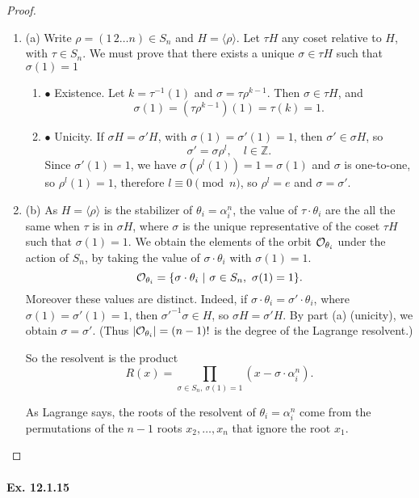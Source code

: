 \documentclass[11pt,a4paper]{article}
\newcommand{\be} {\begin{enumerate}}
\newcommand{\ee} {\end{enumerate}}
\newcommand{\Z}{\mathbb{Z}}
\begin{document}
\begin{proof}
\be
\item[(a)]
Write $\rho =  (1\, 2 \ldots n)  \in S_n$ and $H = \langle \rho \rangle$. Let $\tau H$ any coset relative to $H$, with $\tau \in S_n$. We must prove that there exists a unique $\sigma \in \tau H$ such that $\sigma(1) = 1$
	\be
	
	\item[$\bullet$] Existence.
	Let $k = \tau^{-1}(1)$ and $\sigma = \tau \rho^{k-1}$. Then $\sigma  \in \tau H$, and 
	$$\sigma(1) = (\tau \rho^{k-1})(1) = \tau(k) = 1.$$
	\item[$\bullet$] Unicity. If $\sigma H = \sigma' H$, with $\sigma(1) = \sigma'(1)=1$, then $\sigma' \in \sigma H$, so $$\sigma' = \sigma \rho^l, \quad l\in \Z.$$
	Since $\sigma'(1) = 1$, we have $\sigma(\rho^l(1)) = 1 = \sigma(1)$ and $\sigma$ is one-to-one, so $\rho^l(1) = 1$, therefore $l\equiv 0 \pmod n$, so $\rho^l =  e$ and $\sigma = \sigma'$.
	\ee
\item[(b)] As $H = \langle \rho \rangle$ is the stabilizer of $\theta_i = \alpha_i^n$, the value of $\tau \cdot \theta_i$ are the all the same when $\tau$ is in $\sigma H$, where $\sigma$ is the unique representative of the coset $\tau H$ such that $\sigma(1)=1$. We obtain the elements of the orbit ${\cal O}_{\theta_i}$  under the action of $S_n$, by taking the value of $\sigma \cdot \theta_i$ with $\sigma(1) = 1$. 
$${\cal O}_{\theta_i} = \{ \sigma \cdot \theta_i\ | \ \sigma \in S_n,\  \sigma(1)=1\}.$$
Moreover these values are distinct. Indeed, if $\sigma \cdot \theta_i = \sigma' \cdot \theta_i$, where $\sigma(1) = \sigma'(1) = 1$, then $\sigma'^{-1} \sigma \in H$, so $\sigma H = \sigma' H$. By part (a) (unicity), we obtain $\sigma = \sigma'$. (Thus $|{\cal O}_{\theta_i}| = (n-1)!$ is the degree of the Lagrange resolvent.)

So the resolvent is the product $$R(x) = \prod_{\sigma\in S_n,\ \sigma(1) = 1} (x - \sigma\cdot \alpha_i^n).$$

As Lagrange says,  the roots of the resolvent of $\theta_i =\alpha_i^n$ come from the permutations of the $n-1$ roots $x_2,\ldots,x_n$ that ignore the root $x_1$.
\ee
\end{proof}

\paragraph{Ex. 12.1.15}
\end{document}

